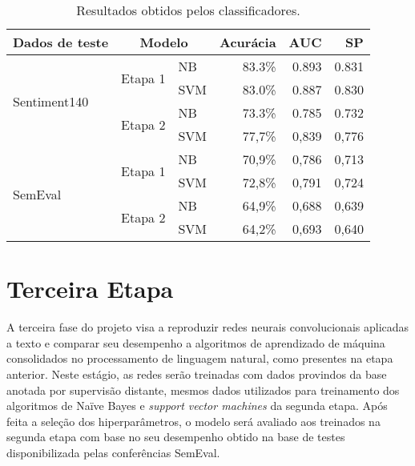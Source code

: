 \begin{table}[h]
    \begin{center}
        \begin{tabular}{ |l|l|l|r|r|r| }
            \hline
            \textbf{Dados de teste} & \multicolumn{2}{|c|}{\textbf{Modelo}}  & \textbf{Acurácia} & \textbf{AUC} & \textbf{SP} \\ \hline
            \multirow{4}{*}{Sentiment140} & \multirow{2}{*}{Etapa 1} & NB  & 83.3\% & 0.893 & 0.831 \\ \cline{3-6}
                                          &                          & SVM & 83.0\% & 0.887 & 0.830 \\ \cline{2-6}
                                          & \multirow{2}{*}{Etapa 2} & NB  & 73.3\% & 0.785 & 0.732 \\ \cline{3-6}
                                          &                          & SVM & 77,7\% & 0,839 & 0,776 \\ \hline
            \multirow{4}{*}{SemEval}      & \multirow{2}{*}{Etapa 1} & NB  & 70,9\% & 0,786 & 0,713 \\ \cline{3-6}
                                          &                          & SVM & 72,8\% & 0,791 & 0,724 \\ \cline{2-6}
                                          & \multirow{2}{*}{Etapa 2} & NB  & 64,9\% & 0,688 & 0,639 \\ \cline{3-6}
                                          &                          & SVM & 64,2\% & 0,693 & 0,640 \\ \hline
        \end{tabular}
        \caption{Resultados obtidos pelos classificadores.}
        \label{tab:linear_perf}
    \end{center}
\end{table}

\section{Terceira Etapa}

A terceira fase do projeto visa a reproduzir redes neurais convolucionais aplicadas a texto e comparar seu desempenho
a algoritmos de aprendizado de máquina consolidados no processamento de linguagem natural, como presentes na etapa
anterior.
Neste estágio, as redes serão treinadas com dados provindos da base anotada por supervisão distante, mesmos dados
utilizados para treinamento dos algoritmos de Naïve Bayes e \textit{support vector machines} da segunda etapa.
Após feita a seleção dos hiperparâmetros, o modelo será avaliado aos treinados na segunda etapa com base no seu
desempenho obtido na base de testes disponibilizada pelas conferências SemEval.

